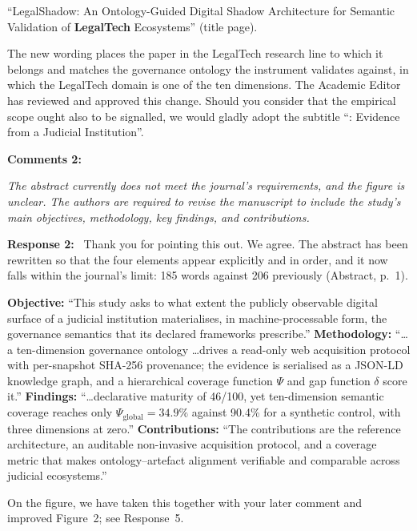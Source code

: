 \documentclass[10pt,a4paper]{article}
\newcommand{\rev}[1]{\textcolor{revred}{#1}}
\newenvironment{revcomment}
  {\begin{mdframed}[backgroundcolor=cmtbg, linecolor=cmtrule, linewidth=0.5pt,
     innertopmargin=5pt, innerbottommargin=5pt, innerleftmargin=7pt,
     innerrightmargin=7pt, skipabove=5pt, skipbelow=5pt]\small\itshape}
  {\end{mdframed}}
\newcommand{\cmt}[2]{\noindent\textbf{Comments #1:}\begin{revcomment}#2\end{revcomment}}
\newcommand{\rsp}[1]{\noindent\textbf{Response #1:}\ }
\begin{document}
\rev{``LegalShadow: An Ontology-Guided Digital Shadow Architecture for Semantic Validation of \textbf{LegalTech} Ecosystems''} (title page).

The new wording places the paper in the LegalTech research line to which it belongs and matches the governance ontology the instrument validates against, in which the LegalTech domain is one of the ten dimensions. The Academic Editor has reviewed and approved this change. Should you consider that the empirical scope ought also to be signalled, we would gladly adopt the subtitle ``: Evidence from a Judicial Institution''.

\cmt{2}{The abstract currently does not meet the journal's requirements, and the figure is unclear. The authors are required to revise the manuscript to include the study's main objectives, methodology, key findings, and contributions.}
\rsp{2} Thank you for pointing this out. We agree. The abstract has been rewritten so that the four elements appear explicitly and in order, and it now falls within the journal's limit: 185 words against 206 previously (Abstract, p.~1).

\rev{\textbf{Objective:} ``This study asks to what extent the publicly observable digital surface of a judicial institution materialises, in machine-processable form, the governance semantics that its declared frameworks prescribe.'' \textbf{Methodology:} ``\dots a ten-dimension governance ontology \dots drives a read-only web acquisition protocol with per-snapshot SHA-256 provenance; the evidence is serialised as a JSON-LD knowledge graph, and a hierarchical coverage function $\Psi$ and gap function $\delta$ score it.'' \textbf{Findings:} ``\dots declarative maturity of 46/100, yet ten-dimension semantic coverage reaches only $\Psi_{\mathrm{global}}=34.9\%$ against 90.4\% for a synthetic control, with three dimensions at zero.'' \textbf{Contributions:} ``The contributions are the reference architecture, an auditable non-invasive acquisition protocol, and a coverage metric that makes ontology--artefact alignment verifiable and comparable across judicial ecosystems.''}

On the figure, we have taken this together with your later comment and improved Figure~2; see Response~5.
\end{document}
